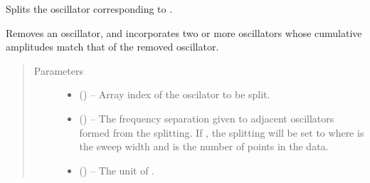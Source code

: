 \documentclass[letterpaper,10pt,english]{sphinxmanual}
\begin{document}
\begin{fulllineitems}
\begin{fulllineitems}
\end{fulllineitems}


\begin{fulllineitems}
\label{\detokenize{references/core:nmrespy.core.Estimator.split_oscillator}}
\sphinxAtStartPar
Splits the oscillator corresponding to .

\sphinxAtStartPar
Removes an oscillator, and incorporates two or more oscillators
whose cumulative amplitudes match that of the removed oscillator.
\begin{quote}\begin{description}
\item[{Parameters}] \leavevmode\begin{itemize}
\item {} 
\sphinxAtStartPar
{} () – Array index of the oscilator to be split.

\item {} 
\sphinxAtStartPar
{} () – The frequency separation given to adjacent oscillators formed
from the splitting. If , the splitting will be set to
 where  is the sweep width and  is the number
of points in the data.

\item {} 
\sphinxAtStartPar
{} (\sphinxstyleliteralemphasis{\sphinxupquote{, }}) – The unit of .


\end{itemize}
\end{description}
\end{quote}
\end{fulllineitems}
\end{fulllineitems}
\end{document}
